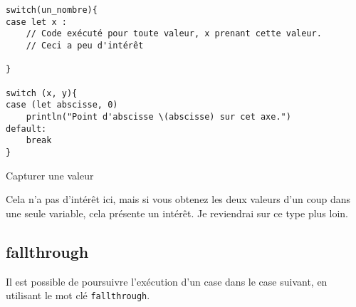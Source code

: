 \begin{listing}[h]
\begin{verbatim}
switch(un_nombre){
case let x :
    // Code exécuté pour toute valeur, x prenant cette valeur.
    // Ceci a peu d'intérêt

}

switch (x, y){
case (let abscisse, 0)
    println("Point d'abscisse \(abscisse) sur cet axe.")
default:
    break
}

\end{verbatim}
\caption{Capturer une valeur}
\end{listing}%
Cela n'a pas d'intérêt ici, mais si vous obtenez les deux valeurs d'un coup dans une seule variable, cela présente un intérêt. Je reviendrai sur ce type plus loin.
\subsection{fallthrough}
Il est possible de poursuivre l'exécution d'un case dans le case suivant, en utilisant le mot clé \texttt{fallthrough}.
